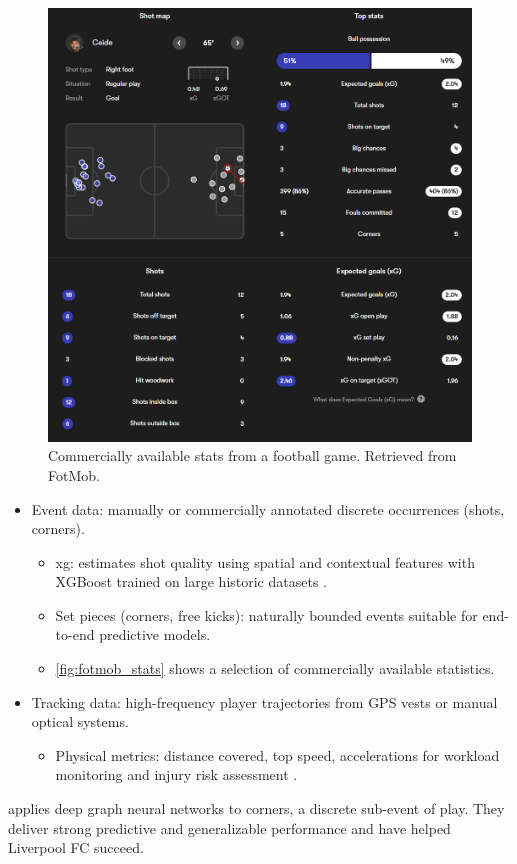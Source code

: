 \begin{figure}
    \centering
    \includegraphics[width=0.66\linewidth]{figures/fotmob_rbk.png}
    \caption{Commercially available stats from a football game. Retrieved from FotMob\cite{fotmob_game}.}
    \label{fig:fotmob_stats}
\end{figure}

\begin{itemize}
    \item Event data: manually or commercially annotated discrete occurrences (shots, corners).
    \begin{itemize}
        \item \acrfull{xg}: estimates shot quality using spatial and contextual features with XGBoost trained on large historic datasets \cite{mead_xg_2023}.
        \item Set pieces (corners, free kicks): naturally bounded events suitable for end-to-end predictive models.
        \item \autoref{fig:fotmob_stats} shows a selection of commercially available statistics. 
    \end{itemize}
    \item Tracking data: high-frequency player trajectories from GPS vests or manual optical systems.
    \begin{itemize}
        \item Physical metrics: distance covered, top speed, accelerations for workload monitoring and injury risk assessment \cite{hennessy_gps_tracker_2018}.
    \end{itemize}
\end{itemize}

\textcite{wang_tactic_ai_2024} applies deep graph neural networks to corners, a discrete sub-event of play. They deliver strong predictive and generalizable performance and have helped Liverpool FC succeed. 

